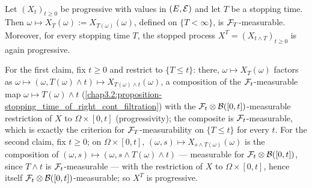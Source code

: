 \begin{proposition} \label{chap3.2:proposition-progressive_at_stopping_time}  \\
Let $(X_t)_{t\ge0}$ be progressive with values in $(E,\mathcal{E})$ and let $T$ be a stopping time. Then $\omega\mapsto X_T(\omega):=X_{T(\omega)}(\omega)$, defined on $\{T<\infty\}$, is $\mathcal{F}_T$-measurable. Moreover, for every stopping time $T$, the stopped process $X^T=(X_{t\wedge T})_{t\ge0}$ is again progressive.
\end{proposition}
\begin{proofidea}
For the first claim, fix $t\ge0$ and restrict to $\{T\le t\}$: there, $\omega\mapsto X_T(\omega)$ factors as $\omega\mapsto(\omega,T(\omega)\wedge t)\mapsto X_{T(\omega)\wedge t}(\omega)$, a composition of the $\mathcal{F}_t$-measurable map $\omega\mapsto T(\omega)\wedge t$ (\cref{chap3.2:proposition-stopping_time_of_right_cont_filtration}) with the $\mathcal{F}_t\otimes\mathcal{B}([0,t])$-measurable restriction of $X$ to $\Omega\times[0,t]$ (progressivity); the composite is $\mathcal{F}_t$-measurable, which is exactly the criterion for $\mathcal{F}_T$-measurability on $\{T\le t\}$ for every $t$. For the second claim, fix $t\ge0$; on $\Omega\times[0,t]$, $(\omega,s)\mapsto X_{s\wedge T(\omega)}(\omega)$ is the composition of $(\omega,s)\mapsto(\omega,s\wedge T(\omega)\wedge t)$ --- measurable for $\mathcal{F}_t\otimes\mathcal{B}([0,t])$, since $T\wedge t$ is $\mathcal{F}_t$-measurable --- with the restriction of $X$ to $\Omega\times[0,t]$, hence itself $\mathcal{F}_t\otimes\mathcal{B}([0,t])$-measurable; so $X^T$ is progressive.
\end{proofidea}

